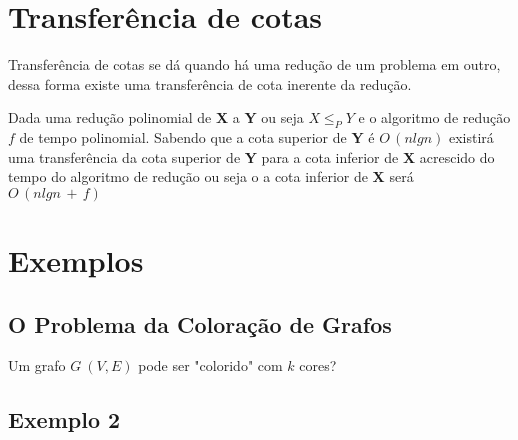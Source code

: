 \documentclass[12pt,a4papper]{article}
\begin{document}
\section{Transferência de cotas}
Transferência de cotas se dá quando há uma redução de um problema em outro, dessa forma existe uma transferência de cota inerente da redução.

Dada uma redução polinomial de \textbf{X} a \textbf{Y} ou seja $X \leq_P Y$ e o algoritmo de redução $f$ de tempo polinomial. Sabendo que a cota superior de \textbf{Y} é $O\,(nlgn)$ existirá uma transferência da cota superior de \textbf{Y} para a cota inferior de \textbf{X} acrescido do tempo do algoritmo de redução ou seja o a cota inferior de \textbf{X} será $O\,(nlgn\,+\,f)$

\section{Exemplos}


\subsection{O Problema da Coloração de Grafos}
Um grafo $G\:(V,E)$ pode ser "colorido" com $k$ cores?

\subsection{Exemplo 2}


\newpage

\nocite{HOPCROFT1974}
\nocite{VIEIRA2001}
\nocite{SKIENA2010}
\nocite{NEAPOLITAN1997}
\nocite{MANBER1989}



\end{document}
